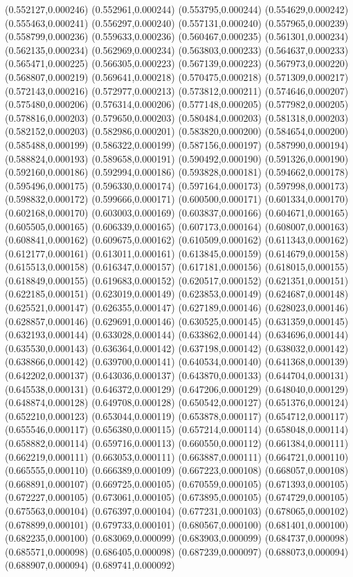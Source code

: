 {(0.552127,0.000246) (0.552961,0.000244) (0.553795,0.000244) (0.554629,0.000242) (0.555463,0.000241) (0.556297,0.000240) (0.557131,0.000240) (0.557965,0.000239) (0.558799,0.000236) (0.559633,0.000236) (0.560467,0.000235) (0.561301,0.000234) (0.562135,0.000234) (0.562969,0.000234) (0.563803,0.000233) (0.564637,0.000233) (0.565471,0.000225) (0.566305,0.000223) (0.567139,0.000223) (0.567973,0.000220) (0.568807,0.000219) (0.569641,0.000218) (0.570475,0.000218) (0.571309,0.000217) (0.572143,0.000216) (0.572977,0.000213) (0.573812,0.000211) (0.574646,0.000207) (0.575480,0.000206) (0.576314,0.000206) (0.577148,0.000205) (0.577982,0.000205) (0.578816,0.000203) (0.579650,0.000203) (0.580484,0.000203) (0.581318,0.000203) (0.582152,0.000203) (0.582986,0.000201) (0.583820,0.000200) (0.584654,0.000200) (0.585488,0.000199) (0.586322,0.000199) (0.587156,0.000197) (0.587990,0.000194) (0.588824,0.000193) (0.589658,0.000191) (0.590492,0.000190) (0.591326,0.000190) (0.592160,0.000186) (0.592994,0.000186) (0.593828,0.000181) (0.594662,0.000178) (0.595496,0.000175) (0.596330,0.000174) (0.597164,0.000173) (0.597998,0.000173) (0.598832,0.000172) (0.599666,0.000171) (0.600500,0.000171) (0.601334,0.000170) (0.602168,0.000170) (0.603003,0.000169) (0.603837,0.000166) (0.604671,0.000165) (0.605505,0.000165) (0.606339,0.000165) (0.607173,0.000164) (0.608007,0.000163) (0.608841,0.000162) (0.609675,0.000162) (0.610509,0.000162) (0.611343,0.000162) (0.612177,0.000161) (0.613011,0.000161) (0.613845,0.000159) (0.614679,0.000158) (0.615513,0.000158) (0.616347,0.000157) (0.617181,0.000156) (0.618015,0.000155) (0.618849,0.000155) (0.619683,0.000152) (0.620517,0.000152) (0.621351,0.000151) (0.622185,0.000151) (0.623019,0.000149) (0.623853,0.000149) (0.624687,0.000148) (0.625521,0.000147) (0.626355,0.000147) (0.627189,0.000146) (0.628023,0.000146) (0.628857,0.000146) (0.629691,0.000146) (0.630525,0.000145) (0.631359,0.000145) (0.632193,0.000144) (0.633028,0.000144) (0.633862,0.000144) (0.634696,0.000144) (0.635530,0.000143) (0.636364,0.000142) (0.637198,0.000142) (0.638032,0.000142) (0.638866,0.000142) (0.639700,0.000141) (0.640534,0.000140) (0.641368,0.000139) (0.642202,0.000137) (0.643036,0.000137) (0.643870,0.000133) (0.644704,0.000131) (0.645538,0.000131) (0.646372,0.000129) (0.647206,0.000129) (0.648040,0.000129) (0.648874,0.000128) (0.649708,0.000128) (0.650542,0.000127) (0.651376,0.000124) (0.652210,0.000123) (0.653044,0.000119) (0.653878,0.000117) (0.654712,0.000117) (0.655546,0.000117) (0.656380,0.000115) (0.657214,0.000114) (0.658048,0.000114) (0.658882,0.000114) (0.659716,0.000113) (0.660550,0.000112) (0.661384,0.000111) (0.662219,0.000111) (0.663053,0.000111) (0.663887,0.000111) (0.664721,0.000110) (0.665555,0.000110) (0.666389,0.000109) (0.667223,0.000108) (0.668057,0.000108) (0.668891,0.000107) (0.669725,0.000105) (0.670559,0.000105) (0.671393,0.000105) (0.672227,0.000105) (0.673061,0.000105) (0.673895,0.000105) (0.674729,0.000105) (0.675563,0.000104) (0.676397,0.000104) (0.677231,0.000103) (0.678065,0.000102) (0.678899,0.000101) (0.679733,0.000101) (0.680567,0.000100) (0.681401,0.000100) (0.682235,0.000100) (0.683069,0.000099) (0.683903,0.000099) (0.684737,0.000098) (0.685571,0.000098) (0.686405,0.000098) (0.687239,0.000097) (0.688073,0.000094) (0.688907,0.000094) (0.689741,0.000092) }
